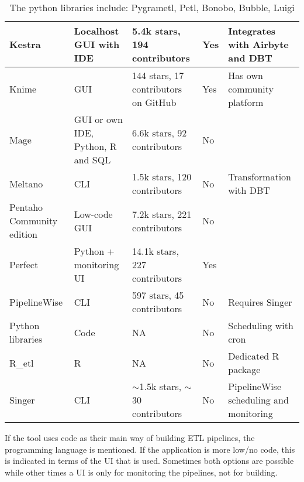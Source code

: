 \documentclass[11pt]{article}
\begin{document}
\begin{table}[H]
\begin{tabular}[c]{|p{2cm}|p{4cm}|p{4cm}|p{1.5cm}|p{4cm}|}
    Kestra & Localhost GUI with IDE & 5.4k stars, 194 contributors & Yes & Integrates with Airbyte and DBT \\ \hline
    Knime & GUI & 144 stars, 17 contributors on GitHub & Yes & Has own community platform \\ \hline
    Mage & GUI or own IDE, Python, R and SQL & 6.6k stars, 92 contributors & No &  \\ \hline
    Meltano & CLI & 1.5k stars, 120 contributors & No & Transformation with DBT \\ \hline
    Pentaho Community edition & Low-code GUI & 7.2k stars, 221 contributors & No &  \\ \hline
    Perfect & Python + monitoring UI & 14.1k stars, 227 contributors & Yes &  \\ \hline
    PipelineWise & CLI & 597 stars, 45 contributors & No & Requires Singer \\ \hline
    Python libraries\text{*} & Code & NA & No & Scheduling with cron \\ \hline
    R\_etl & R & NA & No & Dedicated R package \\ \hline
    Singer & CLI & $\sim$1.5k stars, $\sim$30 contributors & No & PipelineWise scheduling and monitoring \\ \hline
    \end{tabular}
    \caption{\text{*}The python libraries include: Pygrametl, Petl, Bonobo, Bubble, Luigi}
\end{table}

If the tool uses code as their main way of building ETL pipelines, the programming language is mentioned. If the application is more low/no code, this is indicated in terms of the UI that is used. Sometimes both options are possible while other times a UI is only for monitoring the pipelines, not for building.
\end{document}
